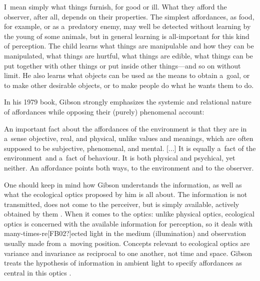 I~mean simply what things furnish, for good or ill. What they afford the observer, after all, depends on their properties. The simplest affordances, as food, for example, or as a~predatory enemy, may well be detected without learning by the young of some animals, but in general learning is all-important for this kind of perception. The child learns what things are manipulable and how they can be manipulated, what things are hurtful, what things are edible, what things can be put together with other things or put inside other things---and so on without limit. He also learns what objects can be used as the means to obtain a~goal, or to make other desirable objects, or to make people do what he wants them to do. 
\parencite[][p.285]{gibson_senses_1966}%




In his 1979 book, Gibson strongly emphasizes the systemic and relational nature of affordances while opposing their (purely) phenomenal account:



An important fact about the affordances of the environment is that they are in a~sense objective, real, and physical, unlike values and meanings, which are often supposed to be subjective, phenomenal, and mental. [...] It is equally a~fact of the environment~and a~fact of behaviour. It is both physical and psychical, yet neither. An affordance points both ways, to the environment and to the observer. 
\parencite[][p.129]{gibson_ecological_1979}%




One should keep in mind how Gibson understands the information, as well as what the ecological optics proposed by him is all about. The information is not transmitted, does not come to the perceiver, but is simply available, actively obtained by them 
\parencite[][p.307]{gibson_ecological_1979}. %
 When it comes to the optics: unlike physical optics, ecological optics is concerned with the available information for perception, so it deals with many-times-re[FB02?]ected light in the medium (illumination) and observation usually made from a~moving position. Concepts relevant to ecological optics are variance and invariance as reciprocal to one another, not time and space. Gibson treats the hypothesis of information in ambient light to specify affordances as central in this optics 
\parencite[][pp.47–64]{}.%




